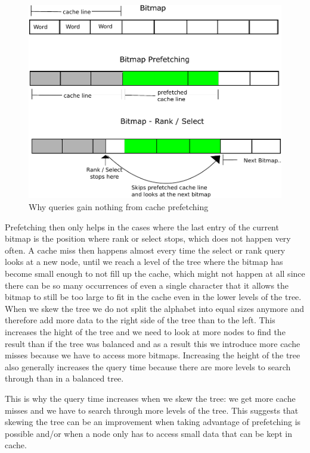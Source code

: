 \begin{figure}
\caption{Why queries gain nothing from cache prefetching}
\label{fig:QueryPrefetchFigure}
\includegraphics[width=\textwidth]{QueryPrefetchFigure.pdf}
\end{figure}

Prefetching then only helps in the cases where the last entry of the current bitmap is the position where rank or select stops, which does not happen very often.
A cache miss then happens almost every time the select or rank query looks at a new node, until we reach a level of the tree where the bitmap has become small enough to not fill up the cache, which might not happen at all since there can be so many occurrences of even a single character that it allows the bitmap to still be too large to fit in the cache even in the lower levels of the tree.
When we skew the tree we do not split the alphabet into equal sizes anymore and therefore add more data to the right side of the tree than to the left. 
This increases the hight of the tree and we need to look at more nodes to find the result than if the tree was balanced and as a result this we introduce more cache misses because we have to access more bitmaps.
Increasing the height of the tree also generally increases the query time because there are more levels to search through than in a balanced tree.

This is why the query time increases when we skew the tree: we get more cache misses and we have to search through more levels of the tree. 
This suggests that skewing the tree can be an improvement when taking advantage of prefetching is possible and/or when a node only has to access small data that can be kept in cache.

